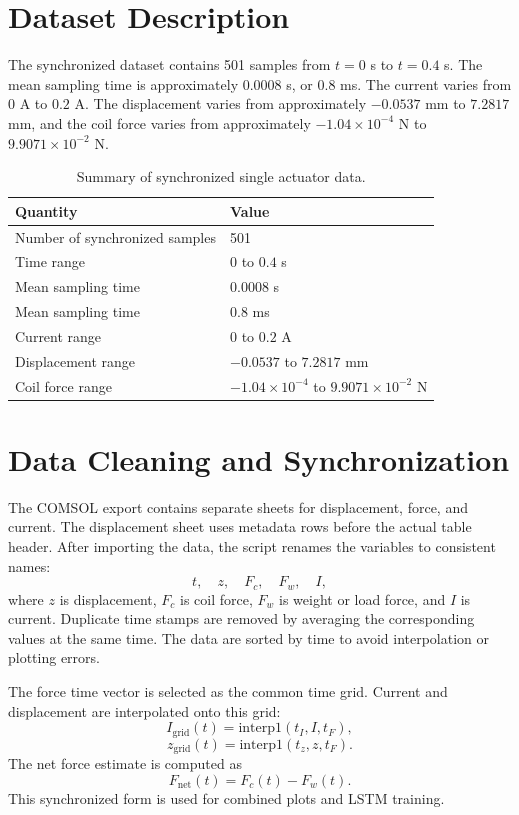 \documentclass[11pt]{article}
\begin{document}
\section{Dataset Description}

The synchronized dataset contains 501 samples from \(t=0\) s to \(t=0.4\) s. The mean sampling time is approximately \(0.0008\) s, or \(0.8\) ms. The current varies from \(0\) A to \(0.2\) A. The displacement varies from approximately \(-0.0537\) mm to \(7.2817\) mm, and the coil force varies from approximately \(-1.04 \times 10^{-4}\) N to \(9.9071 \times 10^{-2}\) N.

\begin{table}[H]
\centering
\caption{Summary of synchronized single actuator data.}
\begin{tabular}{ll}
\toprule
Quantity & Value \\
\midrule
Number of synchronized samples & 501 \\
Time range & \(0\) to \(0.4\) s \\
Mean sampling time & \(0.0008\) s \\
Mean sampling time & \(0.8\) ms \\
Current range & \(0\) to \(0.2\) A \\
Displacement range & \(-0.0537\) to \(7.2817\) mm \\
Coil force range & \(-1.04 \times 10^{-4}\) to \(9.9071 \times 10^{-2}\) N \\
\bottomrule
\end{tabular}
\end{table}

\section{Data Cleaning and Synchronization}

The COMSOL export contains separate sheets for displacement, force, and current. The displacement sheet uses metadata rows before the actual table header. After importing the data, the script renames the variables to consistent names:
\[
    t,\quad z,\quad F_c,\quad F_w,\quad I,
\]
where \(z\) is displacement, \(F_c\) is coil force, \(F_w\) is weight or load force, and \(I\) is current. Duplicate time stamps are removed by averaging the corresponding values at the same time. The data are sorted by time to avoid interpolation or plotting errors.

The force time vector is selected as the common time grid. Current and displacement are interpolated onto this grid:
\begin{equation}
    I_{\mathrm{grid}}(t) = \mathrm{interp1}(t_I, I, t_F),
\end{equation}
\begin{equation}
    z_{\mathrm{grid}}(t) = \mathrm{interp1}(t_z, z, t_F).
\end{equation}
The net force estimate is computed as
\begin{equation}
    F_{\mathrm{net}}(t) = F_c(t) - F_w(t).
\end{equation}
This synchronized form is used for combined plots and LSTM training.
\end{document}
